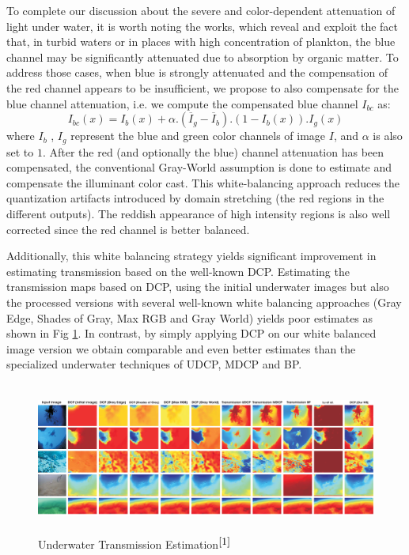 \documentclass[hidelinks, 12pt]{report}
\begin{document}
To complete our discussion about the severe and color-dependent attenuation of light under water, it is worth noting the works, which reveal and exploit the fact that, in turbid waters or in places with high concentration of plankton, the blue channel may be significantly attenuated due to absorption by organic matter. To address those cases, when blue is strongly attenuated and the compensation of the red channel appears to be insufficient, we propose to also compensate for the blue channel attenuation, i.e. we compute the compensated blue channel $I_{bc}$ as:
\begin{equation}
I_{bc}(x)=I_b(x)+\alpha.(\overline{I}_g-\overline{I}_b).(1-I_b(x)).I_g(x)
\end{equation}
where $I_b$ , $I_g$ represent the blue and green color channels of image $I$, and $\alpha$ is also set to $1$. After the red (and optionally the blue) channel attenuation has been compensated, the conventional Gray-World assumption is done to estimate and compensate the illuminant color cast. This white-balancing approach reduces the quantization artifacts introduced by domain stretching (the red regions in the different outputs). The reddish appearance of high intensity regions is also well corrected since the red channel is better balanced. \par
Additionally, this white balancing strategy yields significant improvement in estimating transmission based on the well-known DCP. Estimating the transmission maps based on DCP, using the initial underwater images but also the processed versions with several well-known white balancing approaches (Gray Edge, Shades of Gray, Max RGB and Gray World) yields poor estimates as shown in Fig \ref{Transmission}. In contrast, by simply applying DCP on our white balanced
image version we obtain comparable and even better estimates than the specialized underwater techniques of UDCP, MDCP and BP.
\begin{figure}[H]
\centering
\includegraphics[width=15cm,height=5cm]{Transmission.png}
\caption[Underwater Transmission Estimation]{Underwater Transmission Estimation$^{\cite{1}}$}
\label{Transmission}
\end{figure}
\end{document}
